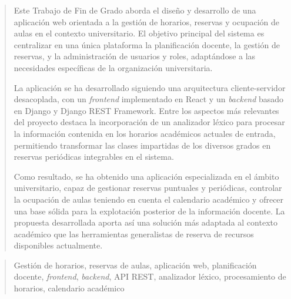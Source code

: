 \documentclass[a4paper,12pt,twoside]{memoir}
\begin{document}
\frontmatter

\renewcommand*\abstractname{Resumen}
\begin{abstract}
Este Trabajo de Fin de Grado aborda el diseño y desarrollo de una aplicación web orientada a la gestión de horarios, reservas y ocupación de aulas en el contexto universitario. El objetivo principal del sistema es centralizar en una única plataforma la planificación docente, la gestión de reservas, y la administración de usuarios y roles, adaptándose a las necesidades específicas de la organización universitaria.

La aplicación se ha desarrollado siguiendo una arquitectura cliente-servidor desacoplada, con un \textit{frontend} implementado en React y un \textit{backend} basado en Django y Django REST Framework. Entre los aspectos más relevantes del proyecto destaca la incorporación de un analizador léxico para procesar la información contenida en los horarios académicos actuales de entrada, permitiendo transformar las clases impartidas de los diversos grados en reservas periódicas integrables en el sistema.

Como resultado, se ha obtenido una aplicación especializada en el ámbito universitario, capaz de gestionar reservas puntuales y periódicas, controlar la ocupación de aulas teniendo en cuenta el calendario académico y ofrecer una base sólida para la explotación posterior de la información docente. La propuesta desarrollada aporta así una solución más adaptada al contexto académico que las herramientas generalistas de reserva de recursos disponibles actualmente.
\end{abstract}

\renewcommand*\abstractname{Descriptores}
\begin{abstract}
Gestión de horarios, reservas de aulas, aplicación web, planificación docente, \textit{frontend}, \textit{backend}, API REST, analizador léxico, procesamiento de horarios, calendario académico
\end{abstract}

\clearpage
\end{document}
